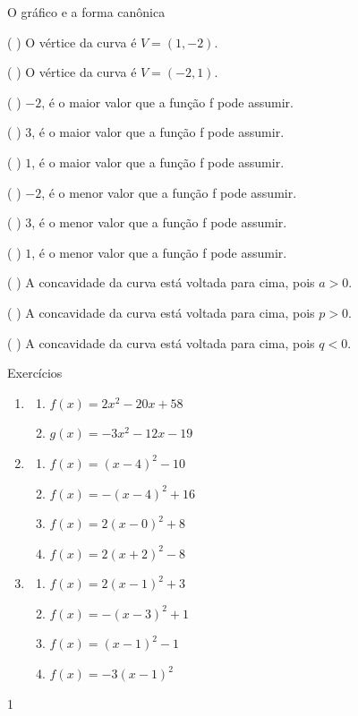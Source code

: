 \begin{task}{O gráfico e a forma canônica}
\begin{enumerate}
({ }{ }{ }) O vértice da curva é \(V=(1,-2)\).

({ }{ }{ }) O vértice da curva é \(V=(-2,1)\).

({ }{ }{ }) \(-2\), é o maior valor que a função f pode assumir.

({ }{ }{ }) \(3\), é o maior valor que a função f pode assumir.

({ }{ }{ }) \(1\), é o maior valor que a função f pode assumir.

({ }{ }{ }) \(-2\), é o menor valor que a função f pode assumir.

({ }{ }{ }) \(3\), é o menor valor que a função f pode assumir.

({ }{ }{ }) \(1\), é o menor valor que a função f pode assumir.

({ }{ }{ }) A concavidade da curva está voltada para cima, pois \(a>0\).

({ }{ }{ }) A concavidade da curva está voltada para cima, pois \(p>0\).

({ }{ }{ }) A concavidade da curva está voltada para cima, pois \(q<0\).

\end{enumerate}
\end{task}

\clearpage
\def\currentcolor{cor1}
\begin{answer}{Exercícios}
{\exerciselist
\begin{enumerate}
\item 
\begin{enumerate}
\item $f(x)=2x^2-20x+58$
\item $g(x)=-3x^2-12x-19$
\end{enumerate}

\item 
\begin{enumerate}
\item $f(x)=(x-4)^2-10$
\item $f(x)=-(x-4)^2+16$
\item $f(x)=2(x-0)^2+8$
\item $f(x)=2(x+2)^2-8$
\end{enumerate}

\item 
\begin{enumerate}
\item $f(x)=2(x-1)^2+3$
\item $f(x)=-(x-3)^2+1$
\item $f(x)=(x-1)^2-1$
\item $f(x)=-3(x-1)^2$
\end{enumerate}

\end{enumerate}
}{1}
\end{answer}
\exercise


